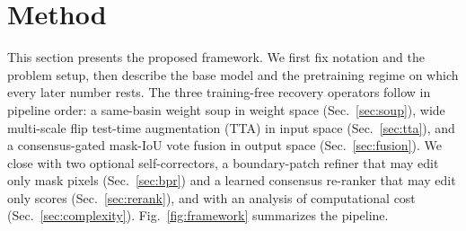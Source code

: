 
\section{Method}\label{sec:method}

This section presents the proposed framework. We first fix notation and the problem setup, then describe the base model and the pretraining regime on which every later number rests. The three training-free recovery operators follow in pipeline order: a same-basin weight soup in weight space (Sec.~\ref{sec:soup}), wide multi-scale flip test-time augmentation (TTA) in input space (Sec.~\ref{sec:tta}), and a consensus-gated mask-IoU vote fusion in output space (Sec.~\ref{sec:fusion}). We close with two optional self-correctors, a boundary-patch refiner that may edit only mask pixels (Sec.~\ref{sec:bpr}) and a learned consensus re-ranker that may edit only scores (Sec.~\ref{sec:rerank}), and with an analysis of computational cost (Sec.~\ref{sec:complexity}). Fig.~\ref{fig:framework} summarizes the pipeline.

